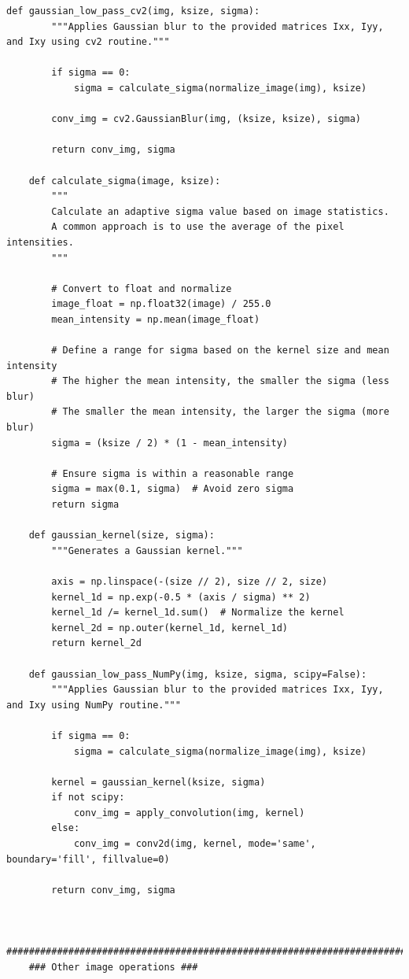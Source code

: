 \documentclass[11pt, conference, letterpaper]{IEEEtran}
\begin{document}
\begin{lstlisting}[style=python, caption={\texttt{image\_utils.py}}, label={lst:iutils}]
    def gaussian_low_pass_cv2(img, ksize, sigma):
        """Applies Gaussian blur to the provided matrices Ixx, Iyy, and Ixy using cv2 routine."""
        
        if sigma == 0:
            sigma = calculate_sigma(normalize_image(img), ksize)
        
        conv_img = cv2.GaussianBlur(img, (ksize, ksize), sigma)
    
        return conv_img, sigma
    
    def calculate_sigma(image, ksize):
        """
        Calculate an adaptive sigma value based on image statistics.
        A common approach is to use the average of the pixel intensities.
        """
        
        # Convert to float and normalize
        image_float = np.float32(image) / 255.0
        mean_intensity = np.mean(image_float)
    
        # Define a range for sigma based on the kernel size and mean intensity
        # The higher the mean intensity, the smaller the sigma (less blur)
        # The smaller the mean intensity, the larger the sigma (more blur)
        sigma = (ksize / 2) * (1 - mean_intensity)
    
        # Ensure sigma is within a reasonable range
        sigma = max(0.1, sigma)  # Avoid zero sigma
        return sigma
    
    def gaussian_kernel(size, sigma):
        """Generates a Gaussian kernel."""
                
        axis = np.linspace(-(size // 2), size // 2, size)
        kernel_1d = np.exp(-0.5 * (axis / sigma) ** 2)
        kernel_1d /= kernel_1d.sum()  # Normalize the kernel
        kernel_2d = np.outer(kernel_1d, kernel_1d)
        return kernel_2d
    
    def gaussian_low_pass_NumPy(img, ksize, sigma, scipy=False):
        """Applies Gaussian blur to the provided matrices Ixx, Iyy, and Ixy using NumPy routine."""
        
        if sigma == 0:
            sigma = calculate_sigma(normalize_image(img), ksize)
            
        kernel = gaussian_kernel(ksize, sigma)
        if not scipy:
            conv_img = apply_convolution(img, kernel)
        else:
            conv_img = conv2d(img, kernel, mode='same', boundary='fill', fillvalue=0)
        
        return conv_img, sigma
    
    
    ##########################################################################################
    ### Other image operations ###
    

\end{lstlisting}
\end{document}
